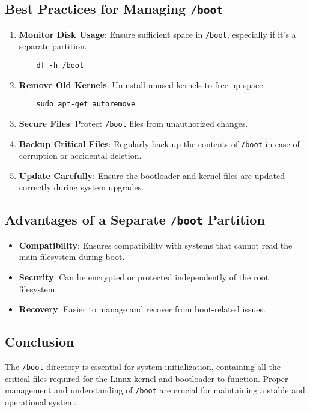 \subsection*{Best Practices for Managing \texttt{/boot}}

\begin{enumerate}
    \item \textbf{Monitor Disk Usage}: Ensure sufficient space in \texttt{/boot}, especially if it's a separate partition.
    \begin{lstlisting}
    df -h /boot
    \end{lstlisting}
    \item \textbf{Remove Old Kernels}: Uninstall unused kernels to free up space.
    \begin{lstlisting}
    sudo apt-get autoremove
    \end{lstlisting}
    \item \textbf{Secure Files}: Protect \texttt{/boot} files from unauthorized changes.
    \item \textbf{Backup Critical Files}: Regularly back up the contents of \texttt{/boot} in case of corruption or accidental deletion.
    \item \textbf{Update Carefully}: Ensure the bootloader and kernel files are updated correctly during system upgrades.
\end{enumerate}

\subsection*{Advantages of a Separate \texttt{/boot} Partition}

\begin{itemize}
    \item \textbf{Compatibility}: Ensures compatibility with systems that cannot read the main filesystem during boot.
    \item \textbf{Security}: Can be encrypted or protected independently of the root filesystem.
    \item \textbf{Recovery}: Easier to manage and recover from boot-related issues.
\end{itemize}

\subsection*{Conclusion}

The \texttt{/boot} directory is essential for system initialization, containing all the critical files required for the Linux kernel and bootloader to function. Proper management and understanding of \texttt{/boot} are crucial for maintaining a stable and operational system.
